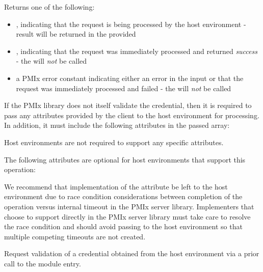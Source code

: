 Returns one of the following:

\begin{itemize}
    \item {}, indicating that the request is being processed by the host environment - result will be returned in the provided 
    \item {}, indicating that the request was immediately processed and returned \textit{success} - the  will \textit{not} be called
    \item a PMIx error constant indicating either an error in the input or that the request was immediately processed and failed - the  will \textit{not} be called
\end{itemize}

\reqattrstart
If the \ac{PMIx} library does not itself validate the credential, then it is required to pass any attributes provided by the client to the host environment for processing. In addition, it must include the following attributes in the passed  array:


\divider

Host environments are not required to support any specific attributes.

\reqattrend

\optattrstart
The following attributes are optional for host environments that support this operation:


\optattrend

\adviceimplstart
We recommend that implementation of the  attribute be left to the host environment due to race condition considerations between completion of the operation versus internal timeout in the \ac{PMIx} server library. Implementers that choose to support  directly in the \ac{PMIx} server library must take care to resolve the race condition and should avoid passing  to the host environment so that multiple competing timeouts are not created.
\adviceimplend


\descr

Request validation of a credential obtained from the host environment via a prior call to the  module entry.

